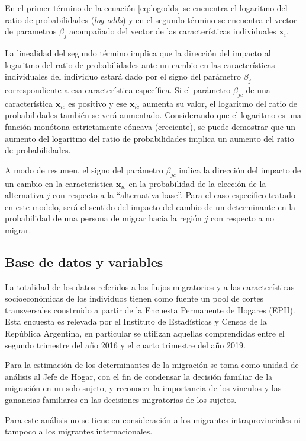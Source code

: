 \documentclass[12pt,a4paper]{article}
\begin{document}
En el primer término de la ecuación \ref{eq:logodds} se encuentra el logaritmo del ratio de probabilidades (\textit{log-odds}) y en el segundo término se encuentra el vector de parametros $\beta_{j}$ acompañado del vector de las características individuales $\textbf{x}_{i}$. 

La linealidad del segundo término implica que la dirección del impacto al logaritmo del ratio de probabilidades ante  un cambio en las características individuales del individuo estará dado por el signo del parámetro $\beta_{j}$ correspondiente a esa característica específica. Si el parámetro  $\beta_{jc}$ de una característica $\textbf{x}_{ic}$ es positivo y ese $\textbf{x}_{ic}$  aumenta su valor, el logaritmo del ratio de probabilidades también se verá aumentado. Considerando que el logaritmo es una función monótona estrictamente cóncava (creciente), se puede demostrar que un aumento del logaritmo del ratio de probabilidades implica un aumento del ratio de probabilidades.

A modo de resumen, el signo del parámetro $\beta_{jc}$ indica la dirección del impacto de un cambio en la característica $\textbf{x}_{ic}$ en la probabilidad de la elección de la alternativa $j$ con respecto a la ``alternativa base''. Para el caso específico tratado en este modelo, será el sentido del impacto del cambio de un determinante en la probabilidad de una persona de migrar hacia la región $j$ con respecto a no migrar.

\subsection{Base de datos y variables}
La totalidad de los datos referidos a los flujos migratorios y a las características socioeconómicas de los individuos tienen como fuente un pool de cortes transversales  construido a partir de la Encuesta Permanente de Hogares (EPH). Esta encuesta es relevada por el Instituto de Estadísticas y Censos de la República Argentina, en particular se utilizan aquellas comprendidas entre el segundo trimestre del año 2016 y el cuarto trimestre del año 2019.

Para la estimación de los determinantes de la migración se toma como unidad de análisis al Jefe de Hogar, con el fin de condensar la decisión familiar de la migración en un solo sujeto, y reconocer la importancia de los vinculos y las ganancias familiares en las decisiones migratorias de los sujetos.

Para este análisis no se tiene en consideración a los migrantes intraprovinciales ni tampoco a los migrantes internacionales.
\end{document}
